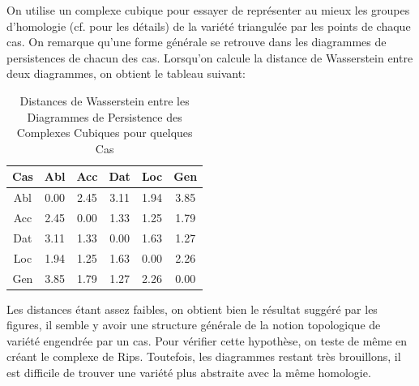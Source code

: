 \documentclass{cours}
\begin{document}
On utilise un complexe cubique pour essayer de représenter au mieux les groupes d'homologie (cf.  pour les détails) de la variété triangulée par les points de chaque cas.
On remarque qu'une forme générale se retrouve dans les diagrammes de persistences de chacun des cas.
Lorsqu'on calcule la distance de Wasserstein entre deux diagrammes, on obtient le tableau suivant:
\begin{table}[H]
\centering
\begin{tabular}{c|ccccc}
	\toprule
	Cas & Abl & Acc & Dat & Loc & Gen\\
	\midrule
	Abl & 0.00 & 2.45 & 3.11 & 1.94 & 3.85\\
	Acc & 2.45 & 0.00 & 1.33 & 1.25 & 1.79\\
	Dat & 3.11 & 1.33 & 0.00 & 1.63 & 1.27\\
	Loc & 1.94 & 1.25 & 1.63 & 0.00 & 2.26\\
	Gen & 3.85 & 1.79 & 1.27 & 2.26 & 0.00\\
	\bottomrule
\end{tabular}
\caption{Distances de Wasserstein entre les Diagrammes de Persistence des Complexes Cubiques pour quelques Cas}
\end{table}

Les distances étant assez faibles, on obtient bien le résultat suggéré par les figures, il semble y avoir une structure générale de la notion topologique de variété engendrée par un cas.
Pour vérifier cette hypothèse, on teste de même en créant le complexe de Rips.
Toutefois, les diagrammes restant très brouillons, il est difficile de trouver une variété plus abstraite avec la même homologie.
\end{document}
